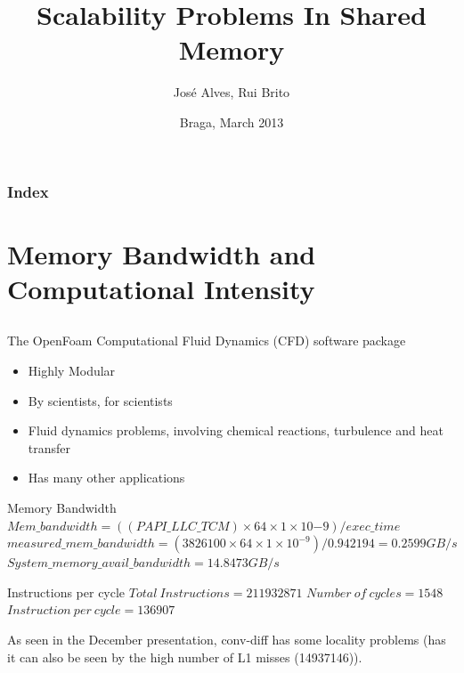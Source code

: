 \documentclass{beamer}
\title{Scalability Problems In Shared Memory}
\author{José Alves, Rui Brito}
\institute[pg22765, pg22781]{
	Universidade do Minho
}
\date{Braga, March 2013}
\begin{document}

\maketitle%

\begin{frame}
	\frametitle{Index}
	\tableofcontents
\end{frame}


\section{Memory Bandwidth and Computational Intensity}
\subsection{}
\small
\begin{frame}
The OpenFoam Computational Fluid Dynamics (CFD) software package
\begin{itemize}
\item Highly Modular
\item By scientists, for scientists
\item Fluid dynamics problems, involving chemical reactions, turbulence and heat transfer
\item Has many other applications
\end{itemize}

\begin{block}{Memory Bandwidth}
	$Mem\_bandwidth = ((PAPI\_LLC\_TCM) \times 64 \times 1 \times 10{-9}) / exec\_time$
	$measured\_mem\_bandwidth = (3826100 \times 64 \times 1 \times 10^{-9})/0.942194 = 0.2599 GB/s$\\
	$System\_memory\_avail\_bandwidth = 14.8473 GB/s$
\end{block}
\begin{block}{Instructions per cycle}
	$Total\ Instructions = 211932871$
	$Number\ of\ cycles = 1548$
	$Instruction\ per\ cycle = 136907$
\end{block}
As seen in the December presentation, conv-diff has some locality problems (has it can also be seen by the high number of L1 misses (14937146)).
\end{frame}
\end{document}
